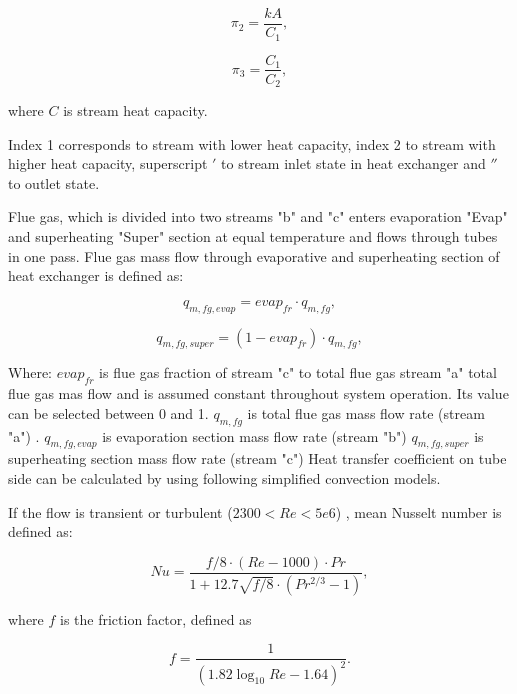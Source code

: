 \documentclass{article}
\begin{document}
	\begin{equation}\label{eq:pi_params2}
		\pi_2 = \frac{kA}{C_1},
	\end{equation}
	
	\begin{equation}\label{eq:pi_params3}
		\pi_3 = \frac{C_1}{C_2},
	\end{equation}
	
	\noindent
	where $C$ is stream heat capacity.
	
	Index 1 corresponds to stream with lower heat capacity, index 2 to stream with higher heat capacity, superscript $'$ to stream inlet state in heat exchanger and $''$ to outlet state.
	
	Flue gas, which is divided into two streams "b" and "c" enters evaporation "Evap" and superheating "Super" section at equal temperature and flows through tubes in one pass. Flue gas mass flow through evaporative and superheating section of heat exchanger is defined as:
	
	\begin{equation}\label{eq:flue_gas_flow1}
		q_{m,fg,evap} = evap_{fr} \cdot q_{m,fg},
	\end{equation}
	
	\begin{equation}\label{eq:flue_gas_flow2}
		q_{m,fg,super} = (1-evap_{fr}) \cdot q_{m,fg},
	\end{equation}
	
	\noindent
	Where:
	$evap_{fr}$ is flue gas fraction of stream "c" to total flue gas stream "a"  total flue gas mas flow and is assumed constant throughout system operation. Its value can be selected between 0 and 1.
	$q_{m,fg}$ is total flue gas mass flow rate (stream "a") .
	$q_{m,fg,evap}$ is evaporation section mass flow rate (stream "b")
	$q_{m,fg,super}$ is superheating section mass flow rate (stream "c")
	Heat transfer coefficient on tube side can be calculated by using following simplified convection models.
	
	\noindent
	If the flow is transient or turbulent ($2300 < Re < 5e6$) , mean Nusselt number is defined as:
	
	\begin{equation}\label{eq:nusselt}
		Nu = \frac{f/8 \cdot (Re - 1000) \cdot Pr}{1+12.7\sqrt{f/8} \cdot (Pr^{2/3}-1)},
	\end{equation}
	
	\noindent
	where $f$ is the friction factor, defined as
	
	\begin{equation}\label{eq:fric_factor}
		f = \frac{1}{(1.82\log_{10}Re - 1.64)^2}.
	\end{equation}
	
\end{document}
